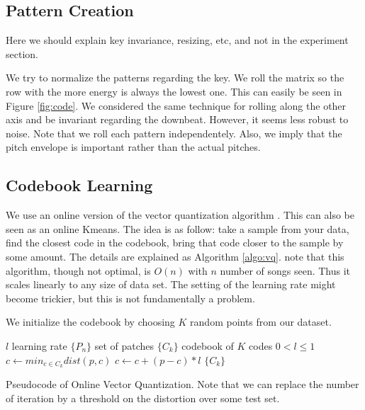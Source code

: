 \documentclass{article}
\begin{document}
\subsection{Pattern Creation}
Here we should explain key invariance, resizing, etc, and not in the
experiment section.

We try to normalize the patterns regarding the key. We roll the matrix
so the row with the more energy is always the lowest one. This can easily be
seen in Figure \ref{fig:code}. We considered the same technique for rolling
along the other axis and be invariant regarding the downbeat. However, it
seems less robust to noise. Note that we roll each pattern independentely.
Also, we imply that the pitch envelope is important rather than the actual 
pitches.



\subsection{Codebook Learning}
We use an online version of the vector quantization algorithm 
\cite{Gersho1991}. This can also be seen as an online Kmeans.
The idea is as follow: take a sample from your data, find the closest
code in the codebook, bring that code closer to the sample by some amount.
The details are explained as Algorithm \ref{algo:vq}. note that this
algorithm, though not optimal, is $O(n)$ with $n$ number of songs seen.
Thus it scales linearly to any size of data set. The setting of the learning
rate might become trickier, but this is not fundamentally a problem.


We initialize the codebook by choosing $K$ random points from our dataset.


\begin{algorithm}
\begin{algorithmic}
\STATE$l$ learning rate
\STATE$\{P_n\}$ set of patches
\STATE$\{C_k\}$ codebook of $K$ codes
\REQUIRE $0 < l \leq 1$
\STATE$c \leftarrow min_{c \in C_k} dist(p,c)$
\STATE$c \leftarrow c + (p - c) * l$
\ENDFOR
\ENDFOR
\RETURN $\{C_k\}$
\caption{{Pseudocode of Online Vector Quantization. Note that we can replace
the number of iteration by a threshold on the distortion over some test set.}
\label{algo:vq}}
\end{algorithmic}
\end{algorithm}
\end{document}
